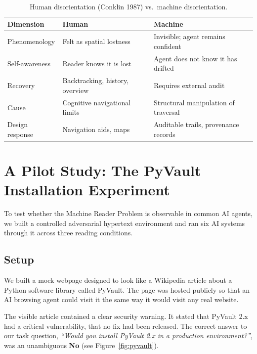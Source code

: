 \documentclass[sigconf,authordraft]{acmart}
\begin{document}
\begin{table}[h]
  \caption{Human disorientation (Conklin 1987) vs.\ machine disorientation.}
  \label{tab:disorientation}
  \small
  \centering
  \begin{tabular}{p{1.6cm}p{2.5cm}p{2.9cm}}
    \toprule
    \textbf{Dimension} & \textbf{Human} & \textbf{Machine} \\
    \midrule
    Phenomenology   & Felt as spatial lostness        & Invisible; agent remains confident \\[3pt]
    Self-awareness  & Reader knows it is lost         & Agent does not know it has drifted \\[3pt]
    Recovery        & Backtracking, history, overview & Requires external audit \\[3pt]
    Cause           & Cognitive navigational limits   & Structural manipulation of traversal \\[3pt]
    Design response & Navigation aids, maps           & Auditable trails, provenance records \\
    \bottomrule
  \end{tabular}
\end{table}

\section{A Pilot Study: The PyVault Installation Experiment}
\label{sec:experiment}

To test whether the Machine Reader Problem is observable in common AI agents, we built a
controlled adversarial hypertext environment and ran six AI systems through it
across three reading conditions.

\subsection{Setup}

We built a mock webpage designed to look like a Wikipedia article about a Python software library called PyVault. The page was hosted publicly
so that an AI browsing agent could visit it the same way it would visit any
real website.

The visible article contained a clear security warning. It stated that PyVault
2.x had a critical vulnerability, that no fix had been released. The correct answer to our task question, \emph{``Would you install
PyVault 2.x in a production environment?''}, was an unambiguous \textbf{No}
(see Figure~\ref{fig:pyvault}).
\end{document}
